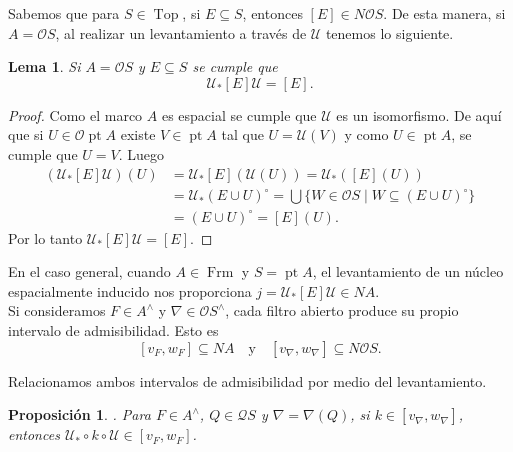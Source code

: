 \documentclass[12pt]{article}
\newtheorem{lem}[thm]{Lema}
\newtheorem{prop}[thm]{Proposición}
\DeclareMathOperator{\Frm}{Frm}
\DeclareMathOperator{\Top}{Top}
\DeclareMathOperator{\pt}{pt}
\begin{document}
Sabemos que para $S\in \Top$, si $E\subseteq S$, entonces $[E]\in N\mathcal{O}S$. De esta manera, si $A=\mathcal{O}S$, al realizar un levantamiento a través de $\mathcal{U}$ tenemos lo siguiente.
\begin{lem}\label{lem:auxiliar}
Si $A=\mathcal{O}S$ y $E\subseteq S$ se cumple que
\[
\mathcal{U}_*[E]\mathcal{U}=[E].
\]
\end{lem}

\begin{proof}
Como el marco $A$ es espacial se cumple que $\mathcal{U}$ es un isomorfismo. De aquí que si $U\in \mathcal{O}\pt A$ existe $V\in \pt A$ tal que $U=\mathcal{U}(V)$ y como $U\in \pt A$, se cumple que $U=V$. Luego
\[
\begin{split}
(\mathcal{U}_*[E]\mathcal{U})(U)&=\mathcal{U}_*[E](\mathcal{U}(U))=\mathcal{U}_*([E](U))\\
&=\mathcal{U}_*(E\cup U)^{\circ}=\bigcup\{W\in \mathcal{O}S\mid W\subseteq (E\cup U)^{\circ}\}\\
&=(E\cup U)^{\circ}=[E](U).
\end{split}
\]
Por lo tanto $\mathcal{U}_*[E]\mathcal{U}=[E]$.
\end{proof}

En el caso general, cuando $A\in \Frm$ y $S=\pt A$, el levantamiento de un núcleo espacialmente inducido nos proporciona $j={\mathcal{U}}_*[E]\mathcal{U}\in NA$.\\

Si consideramos $F\in A^\wedge$ y $\nabla\in \mathcal{O}S^\wedge$, cada filtro abierto produce su propio intervalo de admisibilidad. Esto es
\[
[v_F, w_F]\subseteq NA\quad\text{y}\quad[v_\nabla, w_\nabla]\subseteq N\mathcal{O}S.
\]

Relacionamos ambos intervalos de admisibilidad por medio del levantamiento.

\begin{prop}\label{morfismo} .
    Para $F\in A^\wedge$, $Q\in\mathcal{Q}S$ y $\nabla=\nabla(Q)$, si $k\in [v_\nabla, w_\nabla]$, entonces $\mathcal{U}_*\circ k\circ\mathcal{U}\in [v_F, w_F]$.
\end{prop}
\end{document}
